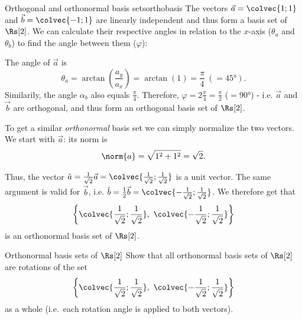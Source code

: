 \begin{example}{Orthogonal and orthonormal basis sets}{orthobasis}
	The vectors $\vec{a}=\colvec{1;1}$ and $\vec{b}=\colvec{-1;1}$ are linearly independent and thus form a basis set of $\Rs[2]$. We can calculate their respective angles in relation to the $x$-axis ($\theta_{a}$ and $\theta_{b}$) to find the angle between them ($\varphi$):

\begin{figure}[H]
	\centering
\end{figure}

The angle of $\vec{a}$ is
\[
	\theta_{a} = \arctan\left( \frac{a_{y}}{a_{x}} \right) = \arctan(1) = \frac{\pi}{4}\ (=\ang{45}).
\]
Similarily, the angle $\alpha_{b}$ also equals $\frac{\pi}{4}$. Therefore, $\varphi=2\frac{\pi}{4}=\frac{\pi}{2}$ ($=\ang{90}$) - i.e. $\vec{a}$ and $\vec{b}$ are orthogonal, and thus form an orthogonal basis set of $\Rs[2]$.

To get a similar \textit{orthonormal} basis set we can simply normalize the two vectors. We start with $\vec{a}$: its norm is
\[
	\norm{a} = \sqrt{1^{2}+1^{2}} = \sqrt{2}.
\]

Thus, the vector $\hat{a}=\frac{1}{\sqrt{2}}\vec{a}=\colvec{\frac{1}{\sqrt{2}};\frac{1}{\sqrt{2}}}$ is a unit vector. The same argument is valid for $\vec{b}$, i.e. $\hat{b}=\frac{1}{2}\vec{b}=\colvec{-\frac{1}{\sqrt{2}};\frac{1}{\sqrt{2}}}$. We therefore get that
\[
	\left\{ \colvec{\frac{1}{\sqrt{2}};\frac{1}{\sqrt{2}}},\ \colvec{-\frac{1}{\sqrt{2}};\frac{1}{\sqrt{2}}} \right\}
\]
is an orthonormal basis set of $\Rs[2]$.
\end{example}

\begin{challenge}{Orthonormal basis sets of $\Rs[2]$}{}
Show that all orthonormal basis sets of $\Rs[2]$ are rotations of the set
\[
	\left\{ \colvec{\frac{1}{\sqrt{2}};\frac{1}{\sqrt{2}}},\ \colvec{-\frac{1}{\sqrt{2}};\frac{1}{\sqrt{2}}} \right\}
\]
as a whole (i.e.\ each rotation angle is applied to both vectors).
\end{challenge}

